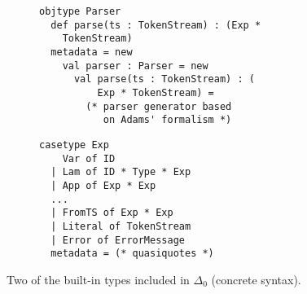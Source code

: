 \begin{figure}[t]
\begin{subfigure}[t]{.55\textwidth}
\begin{lstlisting}
objtype Parser                          
  def parse(ts : TokenStream) : (Exp * 
    TokenStream)
  metadata = new                        
    val parser : Parser = new           
      val parse(ts : TokenStream) : (
          Exp * TokenStream) =            
        (* parser generator based
           on Adams' formalism *)
\end{lstlisting}
\end{subfigure}
\begin{subfigure}[t]{.55\textwidth}
\begin{lstlisting}[linewidth=.5\textwidth]
casetype Exp 
    Var of ID
  | Lam of ID * Type * Exp
  | App of Exp * Exp
  ... 
  | FromTS of Exp * Exp
  | Literal of TokenStream
  | Error of ErrorMessage
  metadata = (* quasiquotes *)
\end{lstlisting}
\end{subfigure}
\caption{Two of the built-in types included in $\Delta_0$ (concrete syntax).}
\vspace{-10px}
\end{figure}
